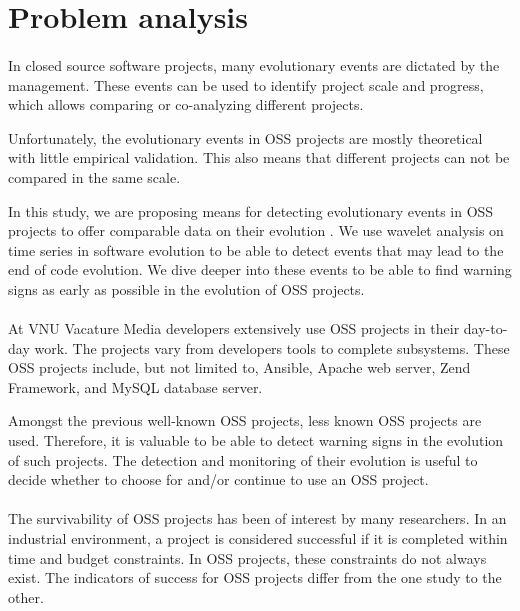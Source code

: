 \section{Problem analysis}
\paragraph{}
In closed source software projects, many evolutionary events are dictated by the
management. These events can be used to identify project scale and progress,
which allows comparing or co-analyzing different projects.

Unfortunately, the evolutionary events in OSS projects are mostly theoretical
with little empirical validation. This also means that different projects can
not be compared in the same scale.

In this study, we are proposing means for detecting evolutionary events in OSS
projects to offer comparable data on their evolution \cite{karus2013}. We use
wavelet analysis on time series in software evolution to be able to detect
events that may lead to the end of code evolution. We dive deeper into these
events to be able to find warning signs as early as possible in the evolution
of OSS projects.

\paragraph{}
At VNU Vacature Media developers extensively use OSS projects in their
day-to-day work. The projects vary from developers tools to complete subsystems.
These OSS projects include, but not limited to, Ansible, Apache web server, Zend
Framework, and MySQL database server.

Amongst the previous well-known OSS projects, less known OSS projects are used.
Therefore, it is valuable to be able to detect warning signs in the
evolution of such projects. The detection and monitoring of their evolution is
useful to decide whether to choose for and/or continue to use an OSS project.

\paragraph{}
The survivability of OSS projects has been of interest by many researchers. In
an industrial environment, a project is considered successful if it is completed
within time and budget constraints. In OSS projects, these constraints do not
always exist. The indicators of success for OSS projects differ from the one
study to the other.

